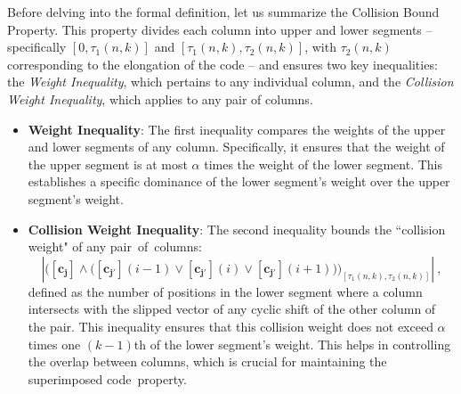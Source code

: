 \documentclass[11pt]{article}
\begin{document}
Before delving into the formal definition, let us summarize the Collision Bound Property. 
This property divides each column into upper and lower segments 
-- specifically $[0, \tau_1(n,k)]$ and $[\tau_1(n,k), \tau_2(n,k)]$, with $\tau_2(n,k)$
corresponding to the elongation of the code -- and ensures two key inequalities: 
the \textit{Weight Inequality}, which pertains to any individual column, 
and the \textit{Collision Weight Inequality}, which applies to any pair of columns.
\vspace*{-1ex}
\begin{itemize}
    \item \textbf{Weight Inequality}: The first inequality compares the weights of the upper and lower segments 
    of any column. Specifically, it ensures that the weight of the upper segment is at most $\alpha$ times 
    the weight of the lower segment. 
    This establishes a specific dominance of the lower segment's weight over the 
    upper segment's weight.
    
\vspace*{-0.5ex}
    \item \textbf{Collision Weight Inequality}: The second inequality bounds the ``collision weight" 
    of any pair~of~columns:
    \[
    \left|\Big(\mathbf{[c_j]} \land \big(\mathbf{[c_{j'}]}(i-1) 
                           \lor \mathbf{[c_{j'}]}(i) 
                           \lor \mathbf{[c_{j'}]}(i+1) \big)
                           \Big)_{[\tau_1(n, k), \tau_2(n, k)]}
    \right| \ ,
    \]
    defined as the number of positions in the lower segment where a column 
    intersects with the slipped vector of any cyclic shift of the other column of the pair. 
    This inequality ensures that this collision 
    weight does not exceed $\alpha$ times one $(k - 1)$th 
    of the lower segment's weight. This helps in 
    controlling the overlap between columns, which is crucial for maintaining the superimposed code~property.
\end{itemize}
\end{document}
